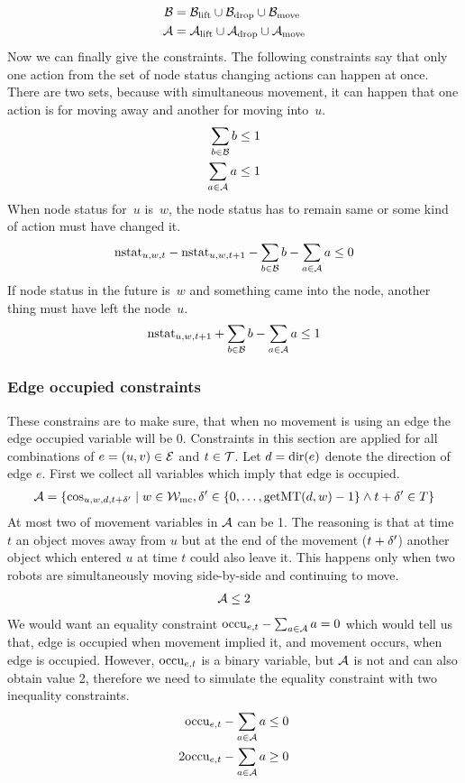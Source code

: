 \begin{align}
    \mathcal{B} &= \mathcal{B}_{\mathrm{lift}} \cup \mathcal{B}_{\mathrm{drop}} \cup \mathcal{B}_{\mathrm{move}} \\
    \mathcal{A} &= \mathcal{A}_{\mathrm{lift}} \cup \mathcal{A}_{\mathrm{drop}} \cup \mathcal{A}_{\mathrm{move}}
\end{align}
Now we can finally give the constraints. The following constraints say that
only one action from the set of node status changing actions can happen at
once. There are two sets, because with simultaneous movement, it can happen
that one action is for moving away and another for moving into~$u$.
\begin{align}
    \sum_{b \in \mathcal{B}} b \leq 1\\
    \sum_{a \in \mathcal{A}} a \leq 1
\end{align}
When node status for~$u$ is~$w$, the node status has to remain same or some
kind of action must have changed it.
\begin{align}
    \mathrm{nstat}_{u,w,t} - \mathrm{nstat}_{u,w,t+1} -\sum_{b \in \mathcal{B}} b -\sum_{a \in \mathcal{A}} a
    \leq 0
\end{align}
If node status in the future is~$w$ and something came into the node, another
thing must have left the node~$u$.
\begin{align}
    \mathrm{nstat}_{u,w,t+1} +\sum_{b \in \mathcal{B}} b -\sum_{a \in \mathcal{A}} a
    \leq 1
\end{align}
\subsubsection{Edge occupied constraints}
These constrains are to make sure, that when no movement is using an edge the
edge occupied variable will be 0. Constraints in this section are applied for
all combinations of $e=(u,v) \in \mathcal{E}$ and $t \in \mathcal{T}$.
Let $d=\mathrm{dir}(e)$ denote the direction of edge $e$. First we collect all variables
which imply that edge is occupied.
\begin{align}
    \mathcal{A} = \{\cos_{u,w,d,t+\delta'} \mid w \in \mathcal{W}_\mathrm{mc}, \delta' \in
    \{0,\ldots,\mathrm{getMT}(d,w)-1\} \wedge t+\delta' \in T\}
\end{align}
At most two of movement
variables in $\mathcal{A}$ can be 1. The reasoning is that at time $t$ an object moves
away from $u$ but at the end of the movement ($t+\delta'$) another object which
entered $u$ at time $t$ could also leave it. This happens only when two robots
are simultaneously moving side-by-side and continuing to move.
\begin{align}
    \mathcal{A} \leq 2
\end{align}
We would want an equality constraint $\mathrm{occu}_{e,t} - \sum_{a \in \mathcal{A}} a = 0$
which would tell us that, edge is occupied when movement implied it, and
movement occurs, when edge is occupied. However, $\mathrm{occu}_{e,t}$ is a binary
variable, but $\mathcal{A}$ is not and can also obtain value 2, therefore we need to
simulate the equality constraint with two inequality constraints.
\begin{align}
    \mathrm{occu}_{e,t} - \sum_{a \in \mathcal{A}}a &\leq 0\\
    2\mathrm{occu}_{e,t} - \sum_{a \in \mathcal{A}}a &\geq 0
\end{align}
